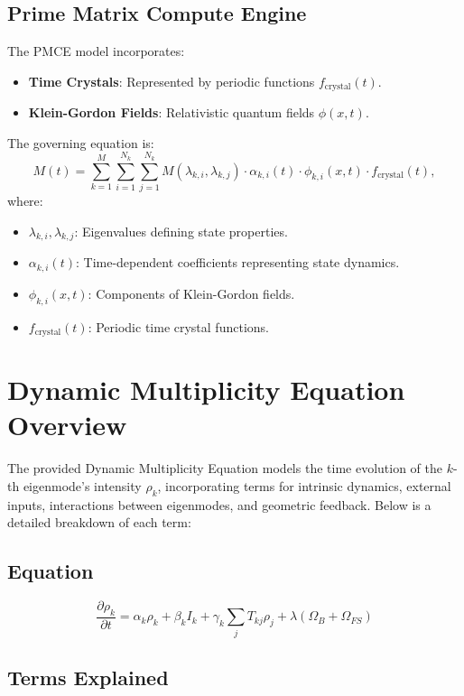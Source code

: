 \documentclass{article}
\theoremstyle{plain}
\begin{document}
\subsection{Prime Matrix Compute Engine}
The PMCE model incorporates:
\begin{itemize}
    \item \textbf{Time Crystals}: Represented by periodic functions \( f_{\text{crystal}}(t) \).
    \item \textbf{Klein-Gordon Fields}: Relativistic quantum fields \( \phi(x, t) \).
\end{itemize}
The governing equation is:
\begin{equation}
M(t) = \sum_{k=1}^M \sum_{i=1}^{N_k} \sum_{j=1}^{N_k} M(\lambda_{k,i}, \lambda_{k,j}) \cdot \alpha_{k,i}(t) \cdot \phi_{k,i}(x,t) \cdot f_{\text{crystal}}(t),
\end{equation}
where:
\begin{itemize}
    \item \( \lambda_{k,i}, \lambda_{k,j} \): Eigenvalues defining state properties.
    \item \( \alpha_{k,i}(t) \): Time-dependent coefficients representing state dynamics.
    \item \( \phi_{k,i}(x,t) \): Components of Klein-Gordon fields.
    \item \( f_{\text{crystal}}(t) \): Periodic time crystal functions.
\end{itemize}

\section{Dynamic Multiplicity Equation Overview}

The provided Dynamic Multiplicity Equation models the time evolution of the \(k\)-th eigenmode’s intensity \(\rho_k\), incorporating terms for intrinsic dynamics, external inputs, interactions between eigenmodes, and geometric feedback. Below is a detailed breakdown of each term:

\subsection{Equation}
\begin{equation}
\frac{\partial \rho_k}{\partial t} = \alpha_k \rho_k + \beta_k I_k + \gamma_k \sum_j T_{kj} \rho_j + \lambda (\Omega_B + \Omega_{FS})
\end{equation}

\subsection{Terms Explained}
\end{document}
